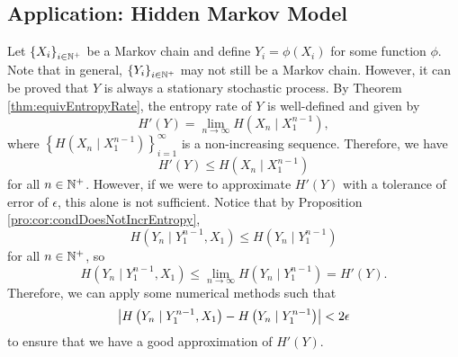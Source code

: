 \documentclass[math, code]{amznotes}
\theoremstyle{remark}
\begin{document}
\subsection{Application: Hidden Markov Model}
Let $\left\{X_i\right\}_{i \in \mathbb{N}^+}$ be a Markov chain and define $Y_i = \phi\left(X_i\right)$ for some function $\phi$. Note that in general, $\left\{Y_i\right\}_{i \in \mathbb{N}^+}$ may not still be a Markov chain. However, it can be proved that $Y$ is always a stationary stochastic process. By Theorem \ref{thm:equivEntropyRate}, the entropy rate of $Y$ is well-defined and given by 
\begin{equation*}
    H'\left(Y\right) = \lim_{n \to \infty}H\left(X_n \mid X_1^{n - 1}\right),
\end{equation*}
where $\left\{H\left(X_n \mid X_1^{n - 1}\right)\right\}_{i = 1}^{\infty}$ is a non-increasing sequence. Therefore, we have 
\begin{equation*}
    H'\left(Y\right) \leq H\left(X_n \mid X_1^{n - 1}\right)
\end{equation*}
for all $n \in \mathbb{N}^+$. However, if we were to approximate $H'\left(Y\right)$ with a tolerance of error of $\epsilon$, this alone is not sufficient. Notice that by Proposition \ref{pro:cor:condDoesNotIncrEntropy}, 
\begin{equation*}
    H\left(Y_n \mid Y_1^{n - 1}, X_1\right) \leq H\left(Y_n \mid Y_1^{n - 1}\right)
\end{equation*}
for all $n \in \mathbb{N}^+$, so 
\begin{equation*}
    H\left(Y_n \mid Y_1^{n - 1}, X_1\right) \leq \lim_{n \to \infty}H\left(Y_n \mid Y_1^{n - 1}\right) = H'\left(Y\right).
\end{equation*}
Therefore, we can apply some numerical methods such that 
\begin{equation*}
    {\left\lvert {H\left(Y_n \mid Y_1^{n - 1}, X_1\right) - H\left(Y_n \mid Y_1^{n - 1}\right)} \right\rvert} < 2\epsilon
\end{equation*}
to ensure that we have a good approximation of $H'\left(Y\right)$.
\end{document}

